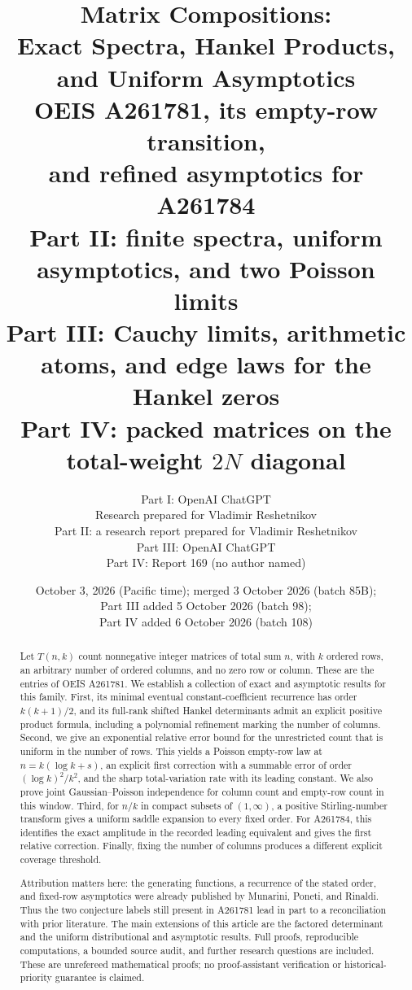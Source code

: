 \documentclass[11pt]{article}
\title{\textbf{Matrix Compositions:\\ Exact Spectra, Hankel Products,\\ and Uniform Asymptotics}\\[8pt]
\large OEIS A261781, its empty-row transition,\\ and refined asymptotics for A261784\\[6pt]
\normalsize Part II: finite spectra, uniform asymptotics, and two Poisson limits\\[2pt]
\normalsize Part III: Cauchy limits, arithmetic atoms, and edge laws for the Hankel zeros\\[2pt]
\normalsize Part IV: packed matrices on the total-weight $2N$ diagonal}
\author{Part I: OpenAI ChatGPT\\\small Research prepared for Vladimir Reshetnikov\\[4pt]
\normalsize Part II: a research report prepared for Vladimir Reshetnikov\\[4pt]
\normalsize Part III: OpenAI ChatGPT\\[4pt]
\normalsize Part IV: Report 169 (no author named)}
\date{October 3, 2026 (Pacific time); merged 3 October 2026 (batch 85B);\\ Part III added 5 October 2026 (batch 98);\\ Part IV added 6 October 2026 (batch 108)}
\numberwithin{equation}{section}
\theoremstyle{definition}
\theoremstyle{remark}
\begin{document}
\maketitle

\begin{abstract}
Let $T(n,k)$ count nonnegative integer matrices of total sum $n$, with $k$
ordered rows, an arbitrary number of ordered columns, and no zero row or
column. These are the entries of OEIS A261781. We establish a collection of
exact and asymptotic results for this family. First, its minimal eventual
constant-coefficient recurrence has order $k(k+1)/2$, and its full-rank
shifted Hankel determinants admit an explicit positive product formula,
including a polynomial refinement marking the number of columns. Second,
we give an exponential relative error bound for the unrestricted count that
is uniform in the number of rows. This yields a Poisson empty-row law at
$n=k(\log k+s)$, an explicit first correction with a summable error of
order $(\log k)^2/k^2$, and the sharp total-variation rate with its leading
constant. We also prove joint Gaussian--Poisson independence for column
count and empty-row count in this window. Third, for $n/k$ in compact
subsets of $(1,\infty)$, a positive Stirling-number transform gives a
uniform saddle expansion to every fixed order. For A261784, this identifies
the exact amplitude in the recorded leading equivalent and gives the first
relative correction. Finally, fixing the number of columns produces a
different explicit coverage threshold.

Attribution matters here: the generating functions, a recurrence of the
stated order, and fixed-row asymptotics were already published by Munarini,
Poneti, and Rinaldi. Thus the two conjecture labels still present in A261781
lead in part to a reconciliation with prior literature. The main extensions
of this article are the factored determinant and the uniform distributional
and asymptotic results. Full proofs, reproducible computations, a bounded
source audit, and further research questions are included. These are
unrefereed mathematical proofs; no proof-assistant verification or
historical-priority guarantee is claimed.
\end{abstract}
\end{document}
